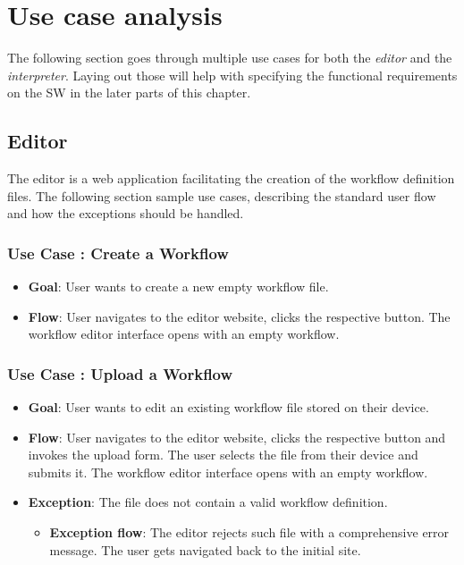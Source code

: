 \section{Use case analysis}

The following section goes through multiple use cases for both the \textit{editor} and the \textit{interpreter}.
Laying out those will help with specifying the functional requirements on the \ac{SW} in the later parts of this chapter.

\subsection{Editor}

The editor is a web application facilitating the creation of the workflow definition files.
The following section sample use cases, describing the standard user flow and how the exceptions should be handled.

\setcounter{usecases}{1}

\def \usecase {Use Case }

\subsubsection*{\usecase: Create a Workflow}
\begin{itemize}
    \item \textbf{Goal}: User wants to create a new empty workflow file.
    \item \textbf{Flow}: User navigates to the editor website, clicks the respective button. 
    The workflow editor interface opens with an empty workflow.
\end{itemize}

\subsubsection*{\usecase: Upload a Workflow}
\begin{itemize}
    \item \textbf{Goal}: User wants to edit an existing workflow file stored on their device. 
    \item \textbf{Flow}: User navigates to the editor website, clicks the respective button and invokes the upload form.
    The user selects the file from their device and submits it. 
    The workflow editor interface opens with an empty workflow.
    \item \textbf{Exception}: The file does not contain a valid workflow definition.
    \begin{itemize}
        \item \textbf{Exception flow}: The editor rejects such file with a comprehensive error message. The user gets navigated back to the initial site.
    \end{itemize}
\end{itemize}

